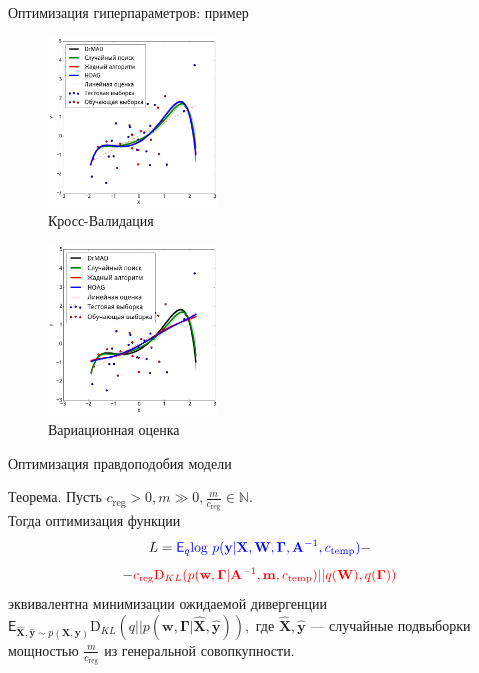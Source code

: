 \documentclass[usenames,dvipsnames,11pt,pdf,utf8,russian,aspectratio=43]{beamer}
\begin{document}
\begin{frame}{Оптимизация гиперпараметров: пример}
\begin{multicols}{2}
\begin{figure}[h]
\includegraphics[width=0.4\textwidth]{./slide_plots/poly_cv.png}
\caption*{Кросс-Валидация}
\end{figure}

\begin{figure}[h]
\includegraphics[width=0.4\textwidth]{./slide_plots/poly_var.png}
\caption*{Вариационная оценка}
\end{figure}
\end{multicols}

\end{frame}






\begin{frame}{Оптимизация правдоподобия модели}

\begin{block}{Теорема.}
Пусть $c_\text{reg} > 0, m \gg 0, \frac{m}{c_\text{reg}} \in \mathbb{N}.$ \\Тогда оптимизация функции \[L = 
\textcolor{blue}{\mathsf{E}_q \text{log}~{p(\mathbf{y} | \mathbf{X}, \mathbf{W}, \boldsymbol{\Gamma}, \mathbf{A}^{-1}, c_{\text{temp}})}} -\]\[- \textcolor{red}{c_\text{reg}\text{D}_{KL}(p(\mathbf{w}, \boldsymbol{\Gamma} |\mathbf{A}^{-1}, \mathbf{m}, c_{\text{temp}}) || q(\mathbf{W}), q(\boldsymbol{\Gamma}))}\] эквивалентна минимизации ожидаемой дивергенции $\mathsf{E}_{\hat{\mathbf{X}}, \hat{\mathbf{y}}\sim p(\mathbf{X}, \mathbf{y})}\text{D}_{KL}(q||p(\mathbf{w}, \boldsymbol{\Gamma} | \hat{\mathbf{X}}, \hat{\mathbf{y}})),$ где $\hat{\mathbf{X}}, \hat{\mathbf{y}}$ --- случайные подвыборки мощностью $\frac{m}{c_\text{reg}}$ из генеральной совопкупности.
\end{block}


\end{frame}
\end{document}
